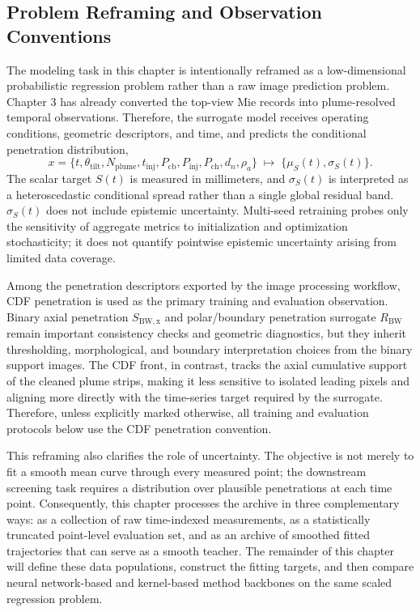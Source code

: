 \subsection{Problem Reframing and Observation Conventions}
\label{sec:surrogate-problem-framing-en}

The modeling task in this chapter is intentionally reframed as a low-dimensional probabilistic regression problem rather than a raw image prediction problem. Chapter 3 has already converted the top-view Mie records into plume-resolved temporal observations. Therefore, the surrogate model receives operating conditions, geometric descriptors, and time, and predicts the conditional penetration distribution,
\[
x=\{t,\theta_{\mathrm{tilt}},N_{\mathrm{plume}},t_{\mathrm{inj}},P_{\mathrm{cb}},P_{\mathrm{inj}},P_{\mathrm{ch}},d_n,\rho_a\}
\;\longmapsto\;
\{\mu_S(t),\sigma_S(t)\}.
\]
The scalar target \(S(t)\) is measured in millimeters, and \(\sigma_S(t)\) is interpreted as a heteroscedastic conditional spread rather than a single global residual band. \(\sigma_S(t)\) does not include epistemic uncertainty. Multi-seed retraining probes only the sensitivity of aggregate metrics to initialization and optimization stochasticity; it does not quantify pointwise epistemic uncertainty arising from limited data coverage.

Among the penetration descriptors exported by the image processing workflow, CDF penetration is used as the primary training and evaluation observation. Binary axial penetration \(S_{\mathrm{BW,x}}\) and polar/boundary penetration surrogate \(R_{\mathrm{BW}}\) remain important consistency checks and geometric diagnostics, but they inherit thresholding, morphological, and boundary interpretation choices from the binary support images. The CDF front, in contrast, tracks the axial cumulative support of the cleaned plume strips, making it less sensitive to isolated leading pixels and aligning more directly with the time-series target required by the surrogate. Therefore, unless explicitly marked otherwise, all training and evaluation protocols below use the CDF penetration convention.

This reframing also clarifies the role of uncertainty. The objective is not merely to fit a smooth mean curve through every measured point; the downstream screening task requires a distribution over plausible penetrations at each time point. Consequently, this chapter processes the archive in three complementary ways: as a collection of raw time-indexed measurements, as a statistically truncated point-level evaluation set, and as an archive of smoothed fitted trajectories that can serve as a smooth teacher. The remainder of this chapter will define these data populations, construct the fitting targets, and then compare neural network-based and kernel-based method backbones on the same scaled regression problem.

